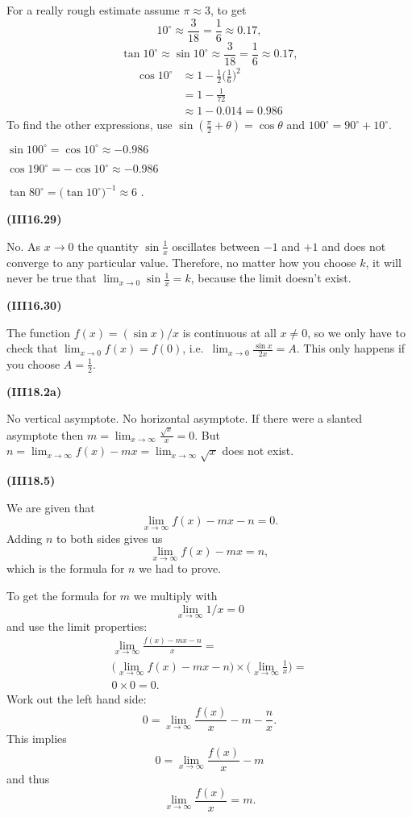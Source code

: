 \documentclass[openany,reqno]{amsbook}
\begin{document}
\begin{trivlist}
  For a really rough estimate assume $\pi\approx3$, to get
  \[
    10^\circ \approx \frac{3}{18} = \frac{1}{6} \approx 0.17,
  \]
  \[
    \tan 10^\circ \approx \sin 10^\circ \approx \frac{3}{18} = \frac{1}{6} \approx
    0.17,
  \]
  \begin{align*}
    \cos 10^\circ &\approx 1 - \frac{1}{2} \bigl(\frac{1}{6}\bigr)^2\\
    &= 1- \frac{1}{72}\\
    &\approx 1-0.014 = 0.986
  \end{align*}
  To find the other expressions, use $\sin(\frac\pi2+\theta) =
  \cos\theta$ and $100^\circ = 90^\circ + 10 ^\circ$.

  $\sin 100^\circ = \cos10^\circ \approx -0.986 $

  $\cos 190^\circ = -\cos 10^\circ \approx -0.986$

  $\tan80^\circ = \bigl(\tan 10^\circ\bigr)^{-1} \approx 6$ .
  \bigskip

\item[{\bf(III16.29)}]

  No.  As \(x\to0\) the quantity \(\sin \frac{1}{x}\) oscillates
  between \(-1\) and \(+1\) and does not converge to any particular
  value.  Therefore, no matter how you choose \(k\), it will never be
  true that \(\lim_{x\to 0} \sin \frac1x = k\), because the limit
  doesn't exist.
  \bigskip

\item[{\bf(III16.30)}]

  The function \(f(x) = (\sin x)/x\) is continuous at all \(x\ne 0\),
  so we only have to check that \(\lim_{x\to0} f(x) = f(0)\), i.e.\
  \(\lim_{x\to0}\frac{\sin x}{2x} = A\).  This only happens if you
  choose \(A=\frac12\).
  \bigskip

\item[{\bf(III18.2a)}]

  No vertical asymptote.
  No horizontal asymptote.
  If there were a slanted asymptote then $m =
  \lim_{x\to\infty}\frac{\sqrt{x}}{x} = 0$. But $n = \lim_{x\to\infty}
  f(x) - mx = \lim_{x\to\infty}\sqrt{x}$ does not exist.
  \bigskip

\item[{\bf(III18.5)}]

  We are given that
  \[
    \lim_{x\to\infty} f(x) - mx-n = 0.
  \]
  Adding $n$ to both sides gives us
  \[
    \lim_{x\to\infty} f(x) -mx = n,
  \]
  which is the formula for $n$ we had to prove.

  To get the formula for $m$ we multiply with
  \[
    \lim_{x\to\infty} 1/x =
    0
  \]
  and use the limit properties:
  \begin{multline*}
    \lim_{x\to\infty} \frac{f(x)-mx-n}{x} = \\
    \bigl(\lim_{x\to\infty} f(x)-mx-n\bigr)\times
    \bigl(\lim_{x\to\infty}\frac{1}{x}\bigr)=\\
    0\times0 = 0.
  \end{multline*}
  Work out the left hand side:
  \[
    0 = \lim_{x\to\infty} \frac{f(x)}{x} - m - \frac{n}{x}.
  \]
  This implies
  \[
    0 = \lim_{x\to\infty} \frac{f(x)}{x} - m
  \]
  and thus
  \[
    \lim_{x\to\infty} \frac{f(x)}{x} = m.
  \]


\end{trivlist}
\end{document}
